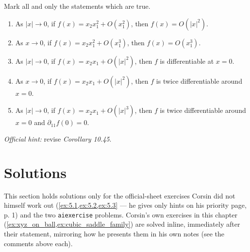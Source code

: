 \begin{exercise}
\label{ex:5.3}
Mark all and only the statements which are true.
\begin{enumerate}[label=\textbf{(\alph*)}]
  \item As $|x| \to 0$, if $f(x) = x_2x_1^2 + O(x_1^2)$, then $f(x) = O(|x|^2)$.
  \item As $x \to 0$, if $f(x) = x_2x_1^2 + O(x_1^3)$, then $f(x) = O(x_1^3)$.
  \item As $|x| \to 0$, if $f(x) = x_2x_1 + O(|x|^2)$, then $f$ is differentiable at $x = 0$.
  \item As $x \to 0$, if $f(x) = x_2x_1 + O(|x|^2)$, then $f$ is twice differentiable around
    $x = 0$.
  \item As $|x| \to 0$, if $f(x) = x_2x_1 + O(|x|^3)$, then $f$ is twice differentiable around
    $x = 0$ and $\partial_{11}f(0) = 0$.
\end{enumerate}
\textit{Official hint:} revise \textit{Corollary 10.45}.
\end{exercise}

\section{Solutions}
\label{sec:week05_solutions}


\begin{ainote}
This section holds solutions only for the official-sheet exercises Corsin did not himself work
out (\cref{ex:5.1,ex:5.2,ex:5.3} --- he gives only hints on his priority page, p. 1) and the two
\texttt{aiexercise} problems. Corsin's own exercises in this chapter
(\cref{ex:xyz_on_ball,ex:cubic_saddle_family}) are solved inline, immediately after their
statement, mirroring how he presents them in his own notes (see the  comments above
each).
\end{ainote}

